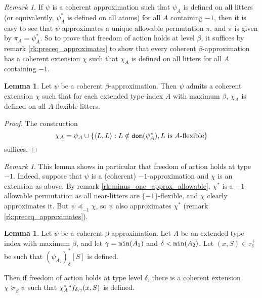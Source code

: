 \documentclass[112pt]{article}
\theoremstyle{definition}
\newtheorem{lemma}[theorem]{Lemma}
\theoremstyle{remark}
\newtheorem{remark}[theorem]{Remark}
\begin{document}
\begin{remark}\label{rk:foa_suffices}
  If $\psi$ is a coherent approximation such that $\psi_A$ is defined on all litters (or equivalently, $\psi_A^*$ is defined on all atoms) for all $A$ containing $-1$, then it is easy to see that $\psi$ approximates a unique allowable permutation $\pi$, and $\pi$ is given by $\pi_A= \psi_A^*$.
  So to prove that freedom of action holds at level $\beta$, it suffices by remark \ref{rk:preceq_approximates} to show that every coherent $\beta$-approximation has a coherent extension $\chi$ such that $\chi_A$ is defined on all litters for all $A$ containing $-1$.
\end{remark}
\begin{lemma}\label{lem:foa_flexible}
  Let $\psi$ be a coherent $\beta$-approximation.
  Then $\psi$ admits a coherent extension $\chi$ such that for each extended type index $A$ with maximum $\beta$, $\chi_A$ is defined on all $A$-flexible litters.
\end{lemma}
\begin{proof}
  The construction
  $$ \chi_A = \psi_A \cup \{ \langle L, L \rangle : L \notin {\tt dom}(\psi_A^*), L\ \mathrm{is}\ A\mathrm{\mbox{-flexible}} \} $$
  suffices.
\end{proof}
\begin{remark}
  This lemma shows in particular that freedom of action holds at type $-1$.
  Indeed, suppose that $\psi$ is a (coherent) $-1$-approximation and $\chi$ is an extension as above.
  By remark \ref{rk:minus_one_approx_allowable}, $\chi^*$ is a $-1$-allowable permutation as all near-litters are $\{-1\}$-flexible, and $\chi$ clearly approximates it.
  But $\psi \preceq_{-1} \chi$, so $\psi$ also approximates $\chi^*$ (remark \ref{rk:preceq_approximates}).
\end{remark}
\begin{lemma}\label{lem:foa_inflexible}
  Let $\psi$ be a coherent $\beta$-approximation.
  Let $A$ be an extended type index with maximum $\beta$, and let $\gamma = {\tt min}(A_1)$ and $\delta < {\tt min}(A_2)$.
  Let $(x, S) \in \tau_\delta^+$ be such that $(\psi_{A_2})_\delta^*[S]$ is defined.

  Then if freedom of action holds at type level $\delta$, there is a coherent extension $\chi \succeq_\beta \psi$ such that $
  \chi_A^* `` f_{\delta,\gamma}(x, S)$ is defined.
\end{lemma}
\end{document}
